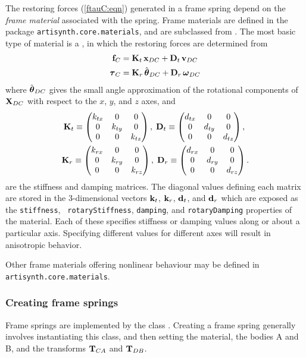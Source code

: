 The restoring forces (\ref{ftauC:eqn}) generated in a frame spring
depend on the {\it frame material} associated with the spring. Frame
materials are defined in the package {\tt artisynth.core.materials},
and are subclassed from
.
The most basic type of material is a 
,
in which the restoring forces are determined from
%
\begin{align*}
{\bf f}_C & = 
{\bf K}_{t} \, {\bf x}_{DC} + {\bf D}_{t} \, {\bf v}_{DC} \\
\boldsymbol\tau_C & = 
{\bf K}_{r} \, \hat{\boldsymbol\theta}_{DC} + {\bf D}_{r} \, \boldsymbol\omega_{DC}
\label{flinear:eqn}
\end{align*}
%
where $\hat{\boldsymbol\theta}_{DC}$ gives the small angle approximation of the
rotational components of ${\bf X}_{DC}$ with respect to the $x$, $y$, and
$z$ axes, and
%
\begin{gather*}
{\bf K}_{t} \equiv 
\left(\begin{matrix} k_{tx} & 0 & 0 \\ 0 & k_{ty} & 0 \\ 0 & 0 & k_{tz} \end{matrix}\right), \;
{\bf D}_{t} \equiv 
\left(\begin{matrix} d_{tx} & 0 & 0 \\ 0 & d_{ty} & 0 \\ 0 & 0 & d_{tz} \end{matrix}\right), \;\\
{\bf K}_{r} \equiv
\left(\begin{matrix} k_{r x} & 0 & 0 \\ 0 & k_{r y} & 0 \\ 0 & 0 & k_{r z} \end{matrix}\right), \;
{\bf D}_{r} \equiv
\left(\begin{matrix} d_{r x} & 0 & 0 \\ 0 & d_{r y} & 0 \\ 0 & 0 & d_{r z} \end{matrix}\right).
\end{gather*}
%
are the stiffness and damping matrices. The diagonal values defining
each matrix are stored in the 3-dimensional vectors ${\bf k}_t$, ${\bf k}_r$,
${\bf d}_t$, and ${\bf d}_r$ which are exposed as the {\tt stiffness}, {\tt
rotaryStiffness}, {\tt damping}, and {\tt rotaryDamping} properties of
the material. Each of these specifies stiffness or damping values
along or about a particular axis. Specifying different values for
different axes will result in anisotropic behavior.

Other frame materials offering nonlinear behaviour may be defined in
{\tt artisynth.core.materials}.

\subsubsection{Creating frame springs}
\label{CreatingFrameSprings:sec}

Frame springs are implemented by the class
.  Creating a frame
spring generally involves instantiating this class, and then setting
the material, the bodies A and B, and the transforms ${\bf T}_{CA}$ and
${\bf T}_{DB}$.


